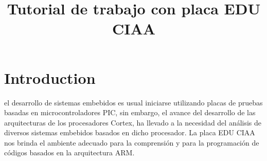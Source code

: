 \documentclass[conference]{IEEEtran}
\begin{document}
\title{Tutorial de trabajo con placa EDU CIAA}

\author{
}

\maketitle


\IEEEdisplaynotcompsoctitleabstractindextext

\IEEEpeerreviewmaketitle

\section{Introduction}

 el desarrollo de sistemas embebidos es usual iniciarse utilizando placas de pruebas basadas en microcontroladores PIC, sin embargo, el avance del desarrollo de las arquitecturas de los procesadores Cortex, ha llevado a la necesidad del análisis de diversos sistemas embebidos basados en dicho procesador. La placa EDU CIAA nos brinda el ambiente adecuado para la comprensión y para la programación de códigos basados en la arquitectura ARM. 

\end{document}
